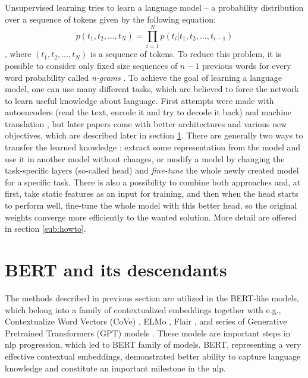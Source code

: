 \par
Unsupervised learning tries to learn a language model -- a probability distribution over a sequence of tokens given by the following equation:
 \begin{equation*}
  p(t_1, t_2,...,t_N) =\prod_{i=1}^{N} p(t_i | t_1, t_2, ..., t_{i-1})
\end{equation*}\citep{Liu2020}, where $(t_1, t_2, \ldots, t_N)$ is a sequence of tokens. To reduce this problem, it is possible to consider only fixed size sequences of $n-1$ previous words for every word probability called \textit{n-grams} \citep{Bengio2003}. To achieve the goal of learning a language model, one can use many different tasks, which are believed to force the network to learn useful knowledge about language. First attempts were made with autoencoders (read the text, encode it and try to decode it back) \citep{Dai2015} and machine translation \citep{Ramachandran2017}, but later papers come with better architectures and various new objectives, which are described later in section \ref{sec:bert}.  There are generally two ways to transfer the learned knowledge \citep{Feijo2020}: extract some representation from the model and use it in another model without changes, or modify a model by changing the task-specific layers (so-called head) and \textit{fine-tune} the whole newly created model for a specific task. There is also a possibility to combine both approaches and, at first, take static features as an input for training, and then when the head starts to perform well, fine-tune the whole model with this better head, so the original weights converge more efficiently to the wanted solution. More detail are offered in section \ref{sub:howto}.
\section{BERT and its descendants}
\label{sec:bert}
The methods described in previous section
are utilized in the BERT-like models, which belong into a family of contextualized embeddings together with e.g., Contextualize Word Vectors (CoVe) \citep{McCann2017, Peters2017}, ELMo \citep{Peters2018}, Flair \citep{Akbik2018}, and series of Generative Pretrained Transformers (GPT) models \citep{Radfort2018, RadfordAlec2019, Brown2020}. These models are important steps in \acrshort{nlp} progression, which led to BERT family of models. BERT, representing a very effective contextual %
 embeddings, demonstrated better ability to capture language knowledge and constitute an important milestone in the \acrshort{nlp}.
